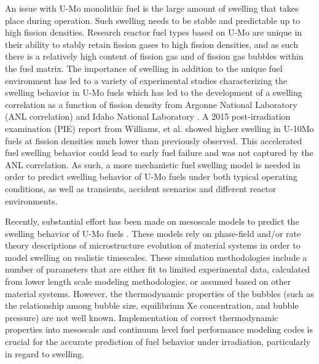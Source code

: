 \documentclass[review]{elsarticle}
\begin{document}
An issue with U-Mo monolithic fuel is the large amount of swelling that takes place during operation\cite{hofman1997}. Such swelling needs to be stable and predictable up to high fission densities. Research reactor fuel types based on U-Mo are unique in their ability to stably retain fission gases to high fission densities, and as such there is a relatively high content of fission gas and of fission gas bubbles within the fuel matrix. The importance of swelling in addition to the unique fuel environment has led to a variety of experimental studies characterizing the swelling behavior in U-Mo fuels \cite{rest2009, kim_anl08, meyer2002, kim2013} which has led to the development of a swelling correlation as a function of fission density from Argonne National Laboratory (ANL correlation) \cite{kim2011} and Idaho National Laboratory \cite{umo_prelim_report2017}. A 2015 post-irradiation examination (PIE) report \cite{afip6report} from Williams, et al. showed higher swelling in U-10Mo fuels at fission densities much lower than previously observed. This accelerated fuel swelling behavior could lead to early fuel failure and was not captured by the ANL correlation. As such, a more mechanistic fuel swelling model is needed in order to predict swelling behavior of U-Mo fuels under both typical operating conditions, as well as transients, accident scenarios and different reactor environments.

Recently, substantial effort has been made on mesoscale models to predict the swelling behavior of U-Mo fuels \cite{liang2018, liang2018a, liang2017, liang2016, ye2018, hu2017a, hu2016, hu2016a}. These models rely on phase-field and/or rate theory descriptions of microstructure evolution of material systems in order to model swelling on realistic timescales. These simulation methodologies include a number of parameters that are either fit to limited experimental data, calculated from lower length scale modeling methodologies, or assumed based on other material systems. However, the thermodynamic properties of the bubbles (such as the relationship among bubble size, equilibrium Xe concentration, and bubble pressure) are not well known. Implementation of correct thermodynamic properties into mesoscale and continuum level fuel performance modeling codes is crucial for the accurate prediction of fuel behavior under irradiation, particularly in regard to swelling. 
\end{document}
